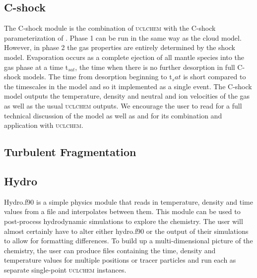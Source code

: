\documentclass{llncs}
\begin{document}
\subsection{C-shock}
The C-shock module is the combination of \textsc{uclchem} with the C-shock parameterization of \citet{jimenez2008}. Phase 1 can be run in the same way as the cloud model. However, in phase 2 the gas properties are entirely determined by the shock model. Evaporation occurs as a complete ejection of all mantle species into the gas phase at a time t$_{sat}$, the time when there is no further desorption in full C-shock models. The time from desorption beginning to t$_sat$ is short compared to the timescales in the model and so it implemented as a single event. The C-shock model outputs the temperature, density and neutral and ion velocities of the gas as well as the usual \textsc{uclchem} outputs. We encourage the user to read \citet{jimenez2008} for a full technical discussion of the model as well as \citet{viti2011} and \citet{Holdship2016b} for its combination and application with \textsc{uclchem}.
%
\subsection{Turbulent Fragmentation}

%
\subsection{Hydro}
Hydro.f90 is a simple physics module that reads in temperature, density and time values from a file and interpolates between them. This module can be used to post-process hydrodynamic simulations to explore the chemistry. The user will almost certainly have to alter either hydro.f90 or the output of their simulations to allow for formatting differences. To build up a multi-dimensional picture of the chemistry, the user can produce files containing the time, density and temperature values for multiple positions or tracer particles and run each as separate single-point \textsc{\textsc{uclchem}} instances.
\end{document}
